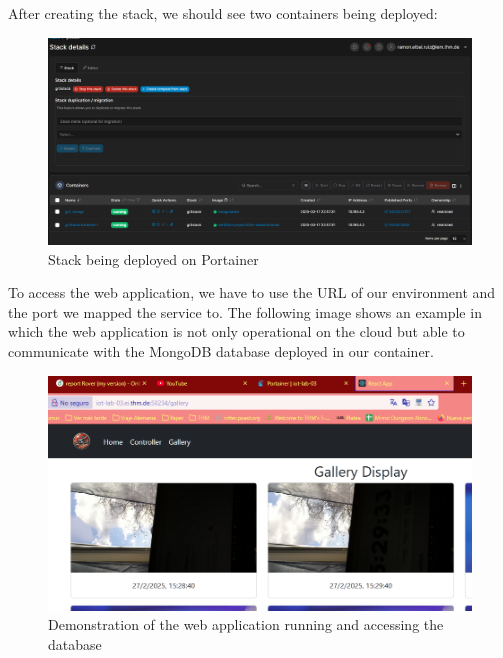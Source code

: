 After creating the stack, we should see two containers being deployed:
\begin{figure}[H]
    \centering
    \includegraphics[width=0.5\linewidth]{stack.png}
    \caption{Stack being deployed on Portainer}
    \label{fig:enter-label}
\end{figure}

To access the web application, we have to use the URL of our environment and the port we mapped the service to. The following image shows an example in which the web application is not only operational on the cloud but able to communicate with the MongoDB database deployed in our container.
\begin{figure}[H]
    \centering
    \includegraphics[width=0.5\linewidth]{clouddemo.png}
    \caption{Demonstration of the web application running and accessing the database}
    \label{fig:enter-label}
\end{figure}